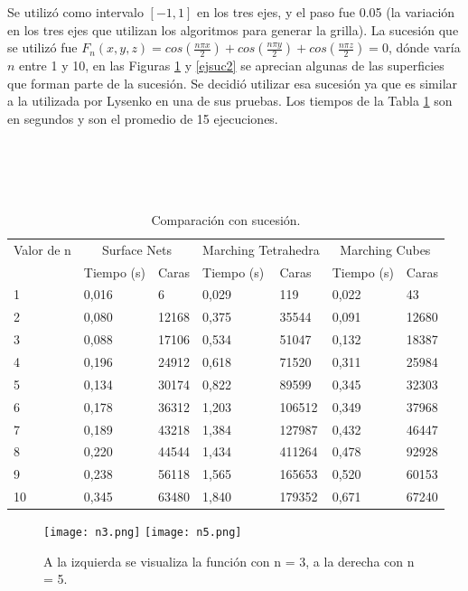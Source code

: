 \documentclass[12pt]{article}
\begin{document}
Se utilizó como intervalo $[-1,1]$ en los tres ejes, y el paso fue 0.05 (la variación en los tres ejes que utilizan los algoritmos para generar la grilla). La sucesión que se utilizó fue $F_n(x,y,z) = cos(\frac{n\pi x}{2}) + cos(\frac{n\pi y}{2}) +cos(\frac{n\pi z}{2}) =0$, dónde varía $n$ entre 1 y 10, en las Figuras \ref{ejsuc1} y \ref{ejsuc2} se aprecian algunas de las superficies que forman parte de la sucesión. Se decidió utilizar esa sucesión ya que es similar a la utilizada por Lysenko en una de sus pruebas. Los tiempos de la Tabla \ref{suc2} son en segundos y son el promedio de 15 ejecuciones.\\\\\\\\\\

\begin{table}[h!]
  \centering
\begin{tabular}{lllllll}
\toprule 
    Valor de n & \multicolumn{2}{c}{Surface Nets} & \multicolumn{2}{c}{Marching Tetrahedra}  & \multicolumn{2}{c}{Marching Cubes}\\
    &Tiempo (s) &Caras
    &Tiempo (s) &Caras
    &Tiempo (s) &Caras \\
    \midrule
    1 & 0,016 &6 & 0,029 &119 & 0,022 &43\\
    2 & 0,080 &12168 & 0,375 &35544 & 0,091 &12680\\
    3 & 0,088 &17106 & 0,534 &51047 & 0,132 &18387\\
    4 & 0,196 &24912 & 0,618 &71520 & 0,311 &25984\\
    5 & 0,134 &30174 & 0,822 &89599 & 0,345 &32303\\
    6 & 0,178 &36312 & 1,203 &106512 & 0,349 &37968\\
    7 & 0,189 &43218 & 1,384 &127987 & 0,432 &46447\\
    8 & 0,220 &44544 & 1,434 &411264 & 0,478 &92928\\
    9 & 0,238 &56118 & 1,565 &165653 & 0,520 &60153\\
    10 & 0,345 &63480 & 1,840 &179352 & 0,671 &67240\\
    \bottomrule
\end{tabular}
  \caption{Comparación con sucesión.}
  \label{suc2}
\end{table}

\begin{figure}[h!]
\texttt{[image: n3.png]}
\hfill
\texttt{[image: n5.png]}
\caption{ A la izquierda se visualiza la función con n = 3, a la derecha con n = 5.}
\label{ejsuc1}
\end{figure}
\end{document}

